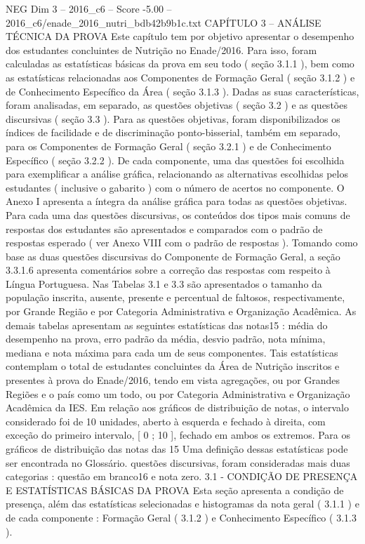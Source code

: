 \begin{textsample}{NEG Dim 3 – 2016\_c6 – Score -5.00 – 2016\_c6/enade\_2016\_nutri\_bdb42b9b1c.txt}  \label{ex:f3_neg_036}
CAPÍTULO 3 – ANÁLISE TÉCNICA DA PROVA Este capítulo tem por objetivo apresentar o desempenho dos estudantes concluintes de Nutrição no Enade/2016.
Para isso, foram calculadas as estatísticas básicas da prova em seu todo ( seção 3.1.1 ), bem como as estatísticas relacionadas aos Componentes de Formação Geral ( seção 3.1.2 ) e de Conhecimento Específico da Área ( seção 3.1.3 ).
Dadas as suas características, foram analisadas, em separado, as questões objetivas ( seção 3.2 ) e as questões discursivas ( seção 3.3 ).
Para as questões objetivas, foram disponibilizados os índices de facilidade e de discriminação ponto-bisserial, também em separado, para os Componentes de Formação Geral ( seção 3.2.1 ) e de Conhecimento Específico ( seção 3.2.2 ).
De cada componente, uma das questões foi escolhida para exemplificar a análise gráfica, relacionando as alternativas escolhidas pelos estudantes ( inclusive o gabarito ) com o número de acertos no componente.
O Anexo I apresenta a íntegra da análise gráfica para todas as questões objetivas.
Para cada uma das questões discursivas, os conteúdos dos tipos mais comuns de respostas dos estudantes são apresentados e comparados com o padrão de respostas esperado ( ver Anexo VIII com o padrão de respostas ).
Tomando como base as duas questões discursivas do Componente de Formação Geral, a seção 3.3.1.6 apresenta comentários sobre a correção das respostas com respeito à Língua Portuguesa.
Nas Tabelas 3.1 e 3.3 são apresentados o tamanho da população inscrita, ausente, presente e percentual de faltosos, respectivamente, por Grande Região e por Categoria Administrativa e Organização Acadêmica.
As demais tabelas apresentam as seguintes estatísticas das notas15 : média do desempenho na prova, erro padrão da média, desvio padrão, nota mínima, mediana e nota máxima para cada um de seus componentes.
Tais estatísticas contemplam o total de estudantes concluintes da Área de Nutrição inscritos e presentes à prova do Enade/2016, tendo em vista agregações, ou por Grandes Regiões e o país como um todo, ou por Categoria Administrativa e Organização Acadêmica da IES.
Em relação aos gráficos de distribuição de notas, o intervalo considerado foi de 10 unidades, aberto à esquerda e fechado à direita, com exceção do primeiro intervalo, [ 0 ; 10 ], fechado em ambos os extremos.
Para os gráficos de distribuição das notas das 15 Uma definição dessas estatísticas pode ser encontrada no Glossário. questões discursivas, foram consideradas mais duas categorias : questão em branco16 e nota zero. 3.1 - CONDIÇÃO DE PRESENÇA E ESTATÍSTICAS BÁSICAS DA PROVA Esta seção apresenta a condição de presença, além das estatísticas selecionadas e histogramas da nota geral ( 3.1.1 ) e de cada componente : Formação Geral ( 3.1.2 ) e Conhecimento Específico ( 3.1.3 ).

\end{textsample}
